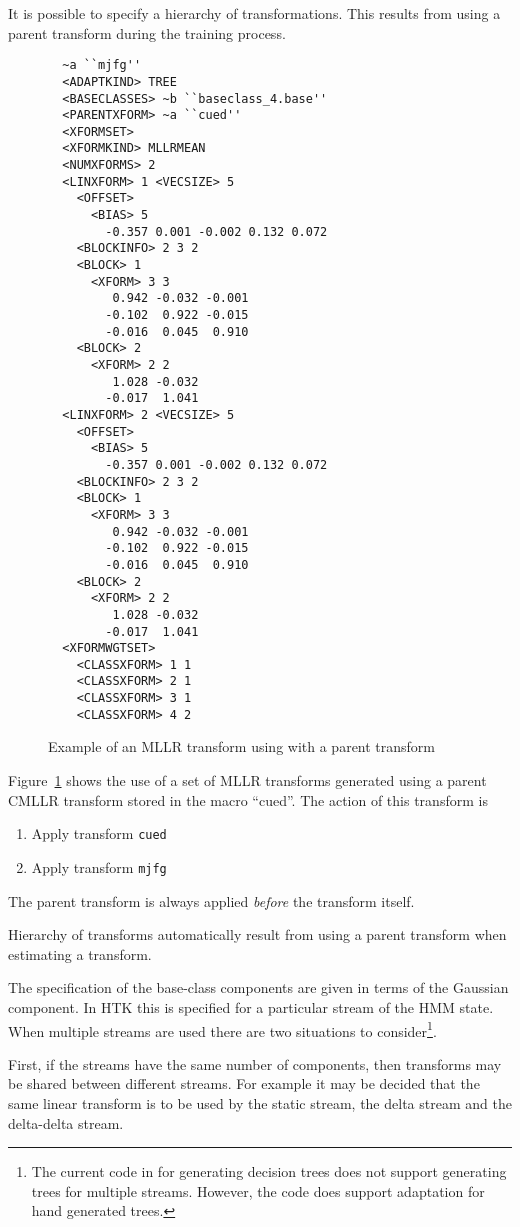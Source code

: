 It is possible to specify a hierarchy of transformations. This results
from using a parent transform during the training process.
\begin{figure}[htbp]
\begin{verbatim}
  ~a ``mjfg''
  <ADAPTKIND> TREE
  <BASECLASSES> ~b ``baseclass_4.base''
  <PARENTXFORM> ~a ``cued''
  <XFORMSET>  
  <XFORMKIND> MLLRMEAN
  <NUMXFORMS> 2
  <LINXFORM> 1 <VECSIZE> 5
    <OFFSET> 
      <BIAS> 5
        -0.357 0.001 -0.002 0.132 0.072
    <BLOCKINFO> 2 3 2
    <BLOCK> 1
      <XFORM> 3 3
         0.942 -0.032 -0.001
        -0.102  0.922 -0.015
        -0.016  0.045  0.910
    <BLOCK> 2
      <XFORM> 2 2
         1.028 -0.032
        -0.017  1.041 
  <LINXFORM> 2 <VECSIZE> 5
    <OFFSET> 
      <BIAS> 5
        -0.357 0.001 -0.002 0.132 0.072
    <BLOCKINFO> 2 3 2
    <BLOCK> 1
      <XFORM> 3 3
         0.942 -0.032 -0.001
        -0.102  0.922 -0.015
        -0.016  0.045  0.910
    <BLOCK> 2
      <XFORM> 2 2
         1.028 -0.032
        -0.017  1.041 
  <XFORMWGTSET>
    <CLASSXFORM> 1 1
    <CLASSXFORM> 2 1
    <CLASSXFORM> 3 1
    <CLASSXFORM> 4 2
\end{verbatim}
\caption{Example of an MLLR transform using with a parent transform}
\label{fig:hiermllr}
\end{figure}
Figure~\ref{fig:hiermllr} shows the use of a set of MLLR transforms
generated using a parent CMLLR transform stored in the macro ``cued''. The
action of this transform is
\begin{enumerate}
\item Apply transform {\tt cued}
\item Apply transform {\tt mjfg}
\end{enumerate}
The parent transform is always applied {\it before} the transform
itself.

Hierarchy of transforms automatically result from using a parent transform
when estimating a transform. 

The specification of the base-class components are given in terms
of the Gaussian component. In HTK this is specified for a particular
stream of the HMM state. When multiple streams are used there are two 
situations to consider\footnote{The current code in  for 
generating decision trees does not support generating trees for multiple 
streams. However, the code does support adaptation for hand generated 
trees.}.

First, if the streams have the same number of components, then transforms
may be shared between different streams. For example it may be decided that
the same linear transform is to be used by the static stream, the delta
stream and the delta-delta stream.


